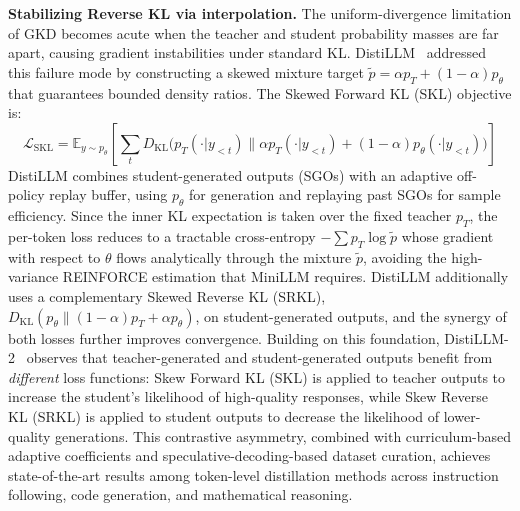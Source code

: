\documentclass{article} %
\newcommand{\KL}{D_{\mathrm{KL}}}
\newcommand{\ptheta}{p_\theta}
\newcommand{\pteacher}{p_T}
\begin{document}
\textbf{Stabilizing Reverse KL via interpolation.}
The uniform-divergence limitation of GKD becomes acute when the teacher and student probability masses are far apart, causing gradient instabilities under standard KL. DistiLLM~\citep{2402.03898} addressed this failure mode by constructing a skewed mixture target $\tilde{p} = \alpha \pteacher + (1{-}\alpha)\ptheta$ that guarantees bounded density ratios. The Skewed Forward KL (SKL) objective is:
\begin{equation}
    \mathcal{L}_{\text{SKL}} = \mathbb{E}_{y \sim \ptheta} \left[ \sum_t \KL\big(\pteacher(\cdot|y_{<t}) \parallel \alpha \pteacher(\cdot|y_{<t}) + (1{-}\alpha) \ptheta(\cdot|y_{<t})\big) \right]
    \label{eq:distillm}
\end{equation}
DistiLLM combines student-generated outputs (SGOs) with an adaptive off-policy replay buffer, using $\ptheta$ for generation and replaying past SGOs for sample efficiency. Since the inner KL expectation is taken over the fixed teacher $\pteacher$, the per-token loss reduces to a tractable cross-entropy $-\sum \pteacher \log \tilde{p}$ whose gradient with respect to $\theta$ flows analytically through the mixture $\tilde{p}$, avoiding the high-variance REINFORCE estimation that MiniLLM requires. DistiLLM additionally uses a complementary Skewed Reverse KL (SRKL), $\KL(\ptheta \| (1{-}\alpha)\pteacher + \alpha\ptheta)$, on student-generated outputs, and the synergy of both losses further improves convergence. Building on this foundation, DistiLLM-2~\citep{2503.07067} observes that teacher-generated and student-generated outputs benefit from \emph{different} loss functions: Skew Forward KL (SKL) is applied to teacher outputs to increase the student's likelihood of high-quality responses, while Skew Reverse KL (SRKL) is applied to student outputs to decrease the likelihood of lower-quality generations. This contrastive asymmetry, combined with curriculum-based adaptive coefficients and speculative-decoding-based dataset curation, achieves state-of-the-art results among token-level distillation methods across instruction following, code generation, and mathematical reasoning.
\end{document}
